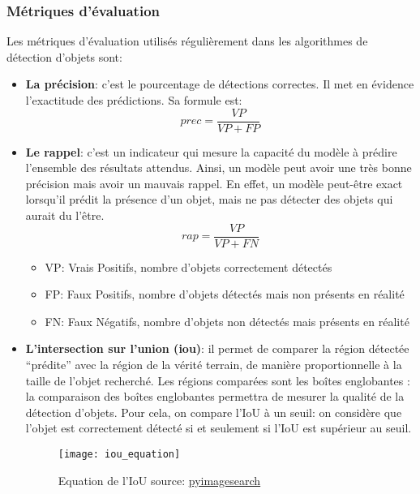         \subsubsection{Métriques d'évaluation}
            Les métriques d’évaluation utilisés régulièrement dans les algorithmes de détection d’objets sont:
            \begin{itemize}
                \item \textbf{La précision}: c’est le pourcentage de détections correctes. Il met en évidence l'exactitude des prédictions. Sa formule est:
                \begin{equation}
                    prec = \frac{VP}{VP + FP}
                \end{equation}
            
                \item \textbf{Le rappel}: c’est un indicateur qui mesure la capacité du modèle à prédire l'ensemble des résultats attendus. Ainsi, un modèle peut avoir une très bonne précision mais avoir un mauvais rappel. En effet, un modèle peut-être exact lorsqu'il prédit la présence d'un objet, mais ne pas détecter des objets qui aurait du l'être.
                    \begin{equation}
                        rap = \frac{VP}{VP + FN}
                    \end{equation}
                    \begin{itemize}
                        \item VP: Vrais Positifs, nombre d'objets correctement détectés
                        \item FP: Faux Positifs, nombre d'objets détectés mais non présents en réalité
                        \item FN: Faux Négatifs, nombre d'objets non détectés mais présents en réalité
                    \end{itemize}
            
                \item \textbf{L’intersection sur l’union (\acrshort{iou})}: il permet de comparer la région détectée “prédite” avec la région de la vérité terrain, de manière proportionnelle à la taille de l'objet recherché. Les régions comparées sont les boîtes englobantes : la comparaison des boîtes englobantes permettra de mesurer la qualité de la détection d'objets. Pour cela, on compare l’IoU à un seuil: on considère que l’objet est correctement détecté si et seulement si l’IoU est supérieur au seuil. 
                    \begin{figure}[H]
                        \centering
                        \texttt{[image: iou\_equation]}
                        \caption{Equation de l'IoU source: \href{https://www.pyimagesearch.com/2016/11/07/intersection-over-union-iou-for-object-detection/}{pyimagesearch}}
                    \end{figure}
            

\end{itemize}
